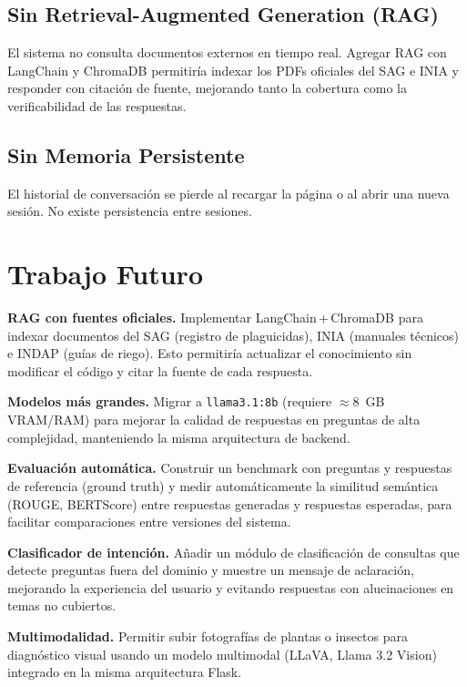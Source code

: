 \documentclass{IEEEtran}
\begin{document}
\subsection{Sin Retrieval-Augmented Generation (RAG)}

El sistema no consulta documentos externos en tiempo real.
Agregar RAG con LangChain y ChromaDB permitiría indexar los PDFs
oficiales del SAG e INIA y responder con citación de fuente,
mejorando tanto la cobertura como la verificabilidad de las respuestas.

\subsection{Sin Memoria Persistente}

El historial de conversación se pierde al recargar la página o al
abrir una nueva sesión. No existe persistencia entre sesiones.

\section{Trabajo Futuro}

\textbf{RAG con fuentes oficiales.}
Implementar LangChain\,+\,ChromaDB para indexar documentos del SAG (registro
de plaguicidas), INIA (manuales técnicos) e INDAP (guías de riego).
Esto permitiría actualizar el conocimiento sin modificar el código y
citar la fuente de cada respuesta.

\textbf{Modelos más grandes.}
Migrar a \texttt{llama3.1:8b} (requiere $\approx$8~GB VRAM/RAM) para
mejorar la calidad de respuestas en preguntas de alta complejidad,
manteniendo la misma arquitectura de backend.

\textbf{Evaluación automática.}
Construir un benchmark con preguntas y respuestas de referencia (ground truth)
y medir automáticamente la similitud semántica (ROUGE, BERTScore) entre
respuestas generadas y respuestas esperadas, para facilitar comparaciones
entre versiones del sistema.

\textbf{Clasificador de intención.}
Añadir un módulo de clasificación de consultas que detecte preguntas fuera
del dominio y muestre un mensaje de aclaración, mejorando la experiencia
del usuario y evitando respuestas con alucinaciones en temas no cubiertos.

\textbf{Multimodalidad.}
Permitir subir fotografías de plantas o insectos para diagnóstico visual
usando un modelo multimodal (LLaVA, Llama 3.2 Vision) integrado en
la misma arquitectura Flask.
\end{document}
